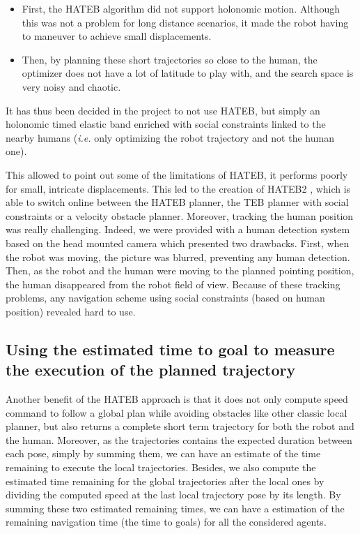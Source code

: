 \documentclass[a4paper,11pt,twoside]{StyleThese}
\begin{document}
\begin{itemize}
\item First, the HATEB algorithm did not support holonomic motion. Although this was not a problem for long distance scenarios, it made the robot having to maneuver to achieve small displacements.

\item Then, by planning these short trajectories so close to the human, the optimizer does not have a lot of latitude to play with, and the search space is very noisy and chaotic.
\end{itemize}

It has thus been decided in the project to not use HATEB, but simply an holonomic timed elastic band enriched with social constraints linked to the nearby humans (\textit{i.e.} only optimizing the robot trajectory and not the human one).

This allowed to point out some of the limitations of HATEB, it performs poorly for small, intricate displacements. This led to the creation of HATEB2 \cite{singamaneni2020hateb}, which is able to switch online between the HATEB planner, the TEB planner with social constraints or a velocity obstacle planner. Moreover, tracking the human position was really challenging. Indeed, we were provided with a human detection system based on the head mounted camera which presented two drawbacks. First, when the robot was moving, the picture was blurred, preventing any human detection. Then, as the robot and the human were moving to the planned pointing position, the human disappeared from the robot field of view. Because of these tracking problems, any navigation scheme using social constraints (based on human position) revealed hard to use.

\subsection{Using the estimated time to goal to measure the execution of the planned trajectory}

Another benefit of the HATEB approach is that it does not only compute speed command to follow a global plan while avoiding obstacles like other classic local planner, but also returns a complete short term trajectory for both the robot and the human. Moreover, as the trajectories contains the expected duration between each pose, simply by summing them, we can have an estimate of the time remaining to execute the local trajectories. Besides, we also compute the estimated time remaining for the global trajectories after the local ones by dividing the computed speed at the last local trajectory pose by its length. By summing these two estimated remaining times, we can have a estimation of the remaining navigation time (the time to goals) for all the considered agents.
\end{document}
